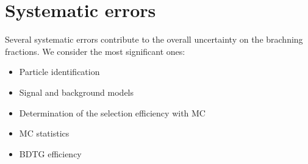 \section{Systematic errors}
\label{sec: systematics}

Several systematic errors contribute to the overall uncertainty on the brachning fractions. We consider the most significant ones:

\begin{itemize}

\item Particle identification

\item Signal and background models

\item Determination of the selection efficiency with MC

\item MC statistics

\item BDTG efficiency

\end{itemize} 

